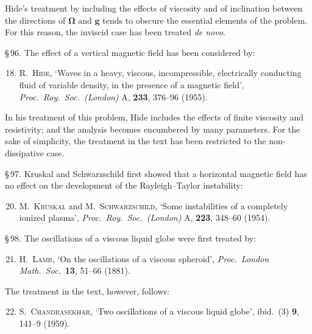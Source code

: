 Hide's treatment by including the effects of viscosity and of inclination between the directions of $\boldsymbol{\Omega}$ and $\mathbf{g}$ tends to obscure the essential elements of the problem. For this reason, the inviscid case has been treated \textit{de novo}.

\medskip
\noindent\S\,96. The effect of a vertical magnetic field has been considered by:

\begin{enumerate}
\setcounter{enumi}{17}
\item \textsc{R.\ Hide}, `Waves in a heavy, viscous, incompressible, electrically conducting fluid of variable density, in the presence of a magnetic field', \textit{Proc.\ Roy.\ Soc.\ (London)} A, \textbf{233}, 376--96 (1955).
\end{enumerate}

In his treatment of this problem, Hide includes the effects of finite viscosity and resistivity; and the analysis becomes encumbered by many parameters. For the sake of simplicity, the treatment in the text has been restricted to the non-dissipative case.

\medskip
\noindent\S\,97. Kruskal and Schwarzschild first showed that a horizontal magnetic field has no effect on the development of the Rayleigh--Taylor instability:

\begin{enumerate}
\setcounter{enumi}{19}
\item \textsc{M.\ Kruskal} and \textsc{M.\ Schwarzschild}, `Some instabilities of a completely ionized plasma', \textit{Proc.\ Roy.\ Soc.\ (London)} A, \textbf{223}, 348--60 (1954).
\end{enumerate}

\medskip
\noindent\S\,98. The oscillations of a viscous liquid globe were first treated by:

\begin{enumerate}
\setcounter{enumi}{20}
\item \textsc{H.\ Lamb}, `On the oscillations of a viscous spheroid', \textit{Proc.\ London Math.\ Soc.}\ \textbf{13}, 51--66 (1881).
\end{enumerate}

The treatment in the text, however, follows:

\begin{enumerate}
\setcounter{enumi}{21}
\item \textsc{S.\ Chandrasekhar}, `Two oscillations of a viscous liquid globe', ibid.\ (3) \textbf{9}, 141--9 (1959).
\end{enumerate}

